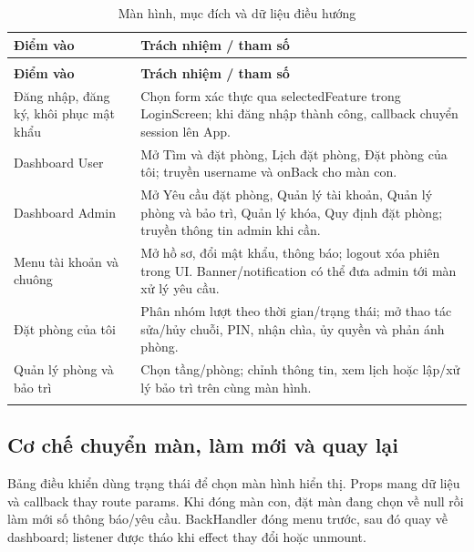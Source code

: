 \FloatBarrier
{\tabletext\renewcommand{\arraystretch}{1.04}\begin{longtable}{>{\raggedright\arraybackslash}p{}>{\raggedright\arraybackslash}p{}}
\caption{Màn hình, mục đích và dữ liệu điều hướng}\label{tab:navigation}\\
\toprule \textbf{Điểm vào} & \textbf{Trách nhiệm / tham số}\\\midrule
\endfirsthead
\multicolumn{2}{l}{\small Màn hình, mục đích và dữ liệu điều hướng (tiếp)}\\
\toprule \textbf{Điểm vào} & \textbf{Trách nhiệm / tham số}\\\midrule
\endhead
\bottomrule\endlastfoot
Đăng nhập, đăng ký, khôi phục mật khẩu & Chọn form xác thực qua selectedFeature trong LoginScreen; khi đăng nhập thành công, callback chuyển session lên App.\\\addlinespace[1.5pt]
Dashboard User & Mở Tìm và đặt phòng, Lịch đặt phòng, Đặt phòng của tôi; truyền username và onBack cho màn con.\\\addlinespace[1.5pt]
Dashboard Admin & Mở Yêu cầu đặt phòng, Quản lý tài khoản, Quản lý phòng và bảo trì, Quản lý khóa, Quy định đặt phòng; truyền thông tin admin khi cần.\\\addlinespace[1.5pt]
Menu tài khoản và chuông & Mở hồ sơ, đổi mật khẩu, thông báo; logout xóa phiên trong UI. Banner/notification có thể đưa admin tới màn xử lý yêu cầu.\\\addlinespace[1.5pt]
Đặt phòng của tôi & Phân nhóm lượt theo thời gian/trạng thái; mở thao tác sửa/hủy chuỗi, PIN, nhận chìa, ủy quyền và phản ánh phòng.\\\addlinespace[1.5pt]
Quản lý phòng và bảo trì & Chọn tầng/phòng; chỉnh thông tin, xem lịch hoặc lập/xử lý bảo trì trên cùng màn hình.\\\addlinespace[1.5pt]
\end{longtable}}

\subsection{Cơ chế chuyển màn, làm mới và quay lại}
Bảng điều khiển dùng trạng thái  để chọn màn hình hiển thị. Props mang dữ liệu và callback thay route params. Khi đóng màn con,  đặt màn đang chọn về null rồi làm mới số thông báo/yêu cầu. BackHandler đóng menu trước, sau đó quay về dashboard; listener được tháo khi effect thay đổi hoặc unmount.

